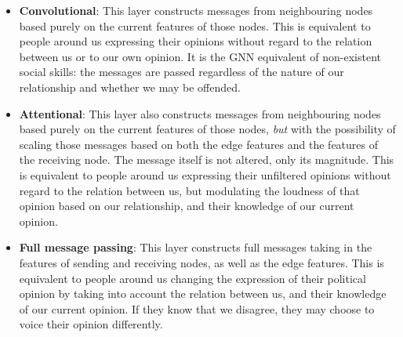 \documentclass[graybox, envcountchap]{Template/svmult}
\begin{document}
\begin{itemize}
    \item \textbf{Convolutional}: This layer constructs messages from neighbouring nodes based purely on the current features of those nodes. This is equivalent to people around us expressing their opinions without regard to the relation between us or to our own opinion. It is the GNN equivalent of non-existent social skills: the messages are passed regardless of the nature of our relationship and whether we may be offended.
    \item \textbf{Attentional}: This layer also constructs messages from neighbouring nodes based purely on the current features of those nodes, \textit{but} with the possibility of scaling those messages based on both the edge features and the features of the receiving node. The message itself is not altered, only its magnitude. This is equivalent to people around us expressing their unfiltered opinions without regard to the relation between us, but modulating the loudness of that opinion based on our relationship, and their knowledge of our current opinion.
    \item \textbf{Full message passing}: This layer constructs full messages taking in the features of sending and receiving nodes, as well as the edge features. This is equivalent to people around us changing the expression of their political opinion by taking into account the relation between us, and their knowledge of our current opinion. If they know that we disagree, they may choose to voice their opinion differently.
\end{itemize}
\end{document}
